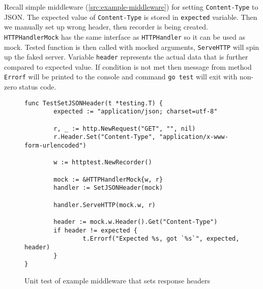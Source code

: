Recall simple middleware (\ref{src:example-middleware}) for setting \verb|Content-Type| to JSON\@. The expected value of  \verb|Content-Type| is stored in \verb|expected| variable. Then we manually set up wrong header, then recorder is being created. \verb|HTTPHandlerMock| has the same interface as \verb|HTTPHandler| so it can be used as mock. Tested function is then called with mocked arguments, \verb|ServeHTTP| will spin up the faked server. Variable \verb|header| represents the actual data that is further compared to expected value. If condition is not met then message from method \verb|Errorf| will be printed to the console and command \verb|go test| will exit with non-zero status code.

\begin{figure}[!htbp]
\begin{verbatim}
func TestSetJSONHeader(t *testing.T) {
        expected := "application/json; charset=utf-8"

        r, _ := http.NewRequest("GET", "", nil)
        r.Header.Set("Content-Type", "application/x-www-form-urlencoded")

        w := httptest.NewRecorder()

        mock := &HTTPHandlerMock{w, r}
        handler := SetJSONHeader(mock)

        handler.ServeHTTP(mock.w, r)

        header := mock.w.Header().Get("Content-Type")
        if header != expected {
                t.Errorf("Expected %s, got `%s`", expected, header)
        }
}
\end{verbatim}
\renewcommand\figurename{Code}
\caption{Unit test of example middleware that sets response headers}
\label{src:test-example-middleware}
\end{figure}
